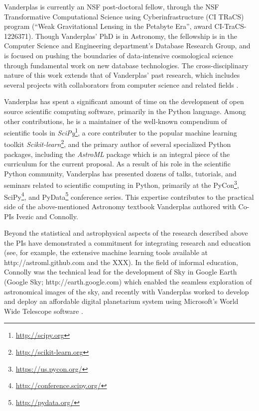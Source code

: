 Vanderplas is currently an NSF post-doctoral fellow, through the NSF
Transformative Computational Science using Cyberinfrastructure (CI TRaCS)
program (``Weak Gravitational Lensing in the Petabyte Era'', award
CI-TraCS-1226371).
Though Vanderplas' PhD is in Astronomy, the fellowship is in the Computer
Science and Engineering department's Database Research Group, and is focused
on pushing the boundaries of data-intensive cosmological science through
fundamental work on new database technologies. The cross-disciplinary nature
of this work extends that of Vanderplas' past research, which includes several
projects with collaborators from computer science and related fields
\cite{daniel2011, Xiong2011, scikit-learn1, scikit-learn2}.

Vanderplas has spent a significant amount of time on the development of
open source scientific computing software, primarily in the Python
language.  Among other contributions,
he is a maintainer of the well-known compendium of scientific tools in
{\it SciPy}\footnote{\url{http://scipy.org}}, a core contributer to the
popular machine learning toolkit
{\it Scikit-learn}\footnote{\url{http://scikit-learn.org}},
and the primary author of several specialized Python packages,
including the {\it AstroML} package which is an integral piece of the
curriculum for the current proposal.
As a result of his role in the scientific Python community, Vanderplas
has presented dozens of talks, tutorials, and seminars related to scientific
computing in Python, primarily at the
PyCon\footnote{\url{https://us.pycon.org/}},
SciPy\footnote{\url{http://conference.scipy.org/}},
and PyData\footnote{\url{http://pydata.org/}} conference series.
This expertise contributes to the practical side of the above-mentioned
Astronomy textbook Vanderplas authored with Co-PIs Ivezic and Connolly.

Beyond the statistical and astrophysical aspects of the research
described above the PIs have demonstrated a commitment for integrating
research and education (see, for example, the extensive machine
learning tools available at http://astroml.github.com and the XXX). In
the field of informal education, Connolly was the technical lead for
the development of Sky in Google Earth (Google Sky;
http://earth.google.com) which enabled the seamless exploration of
astronomical images of the sky, and recently with Vanderplas worked to
develop and deploy an affordable digital planetarium system using Microsoft's
World Wide Telescope software \cite{rosenfield2011}.

